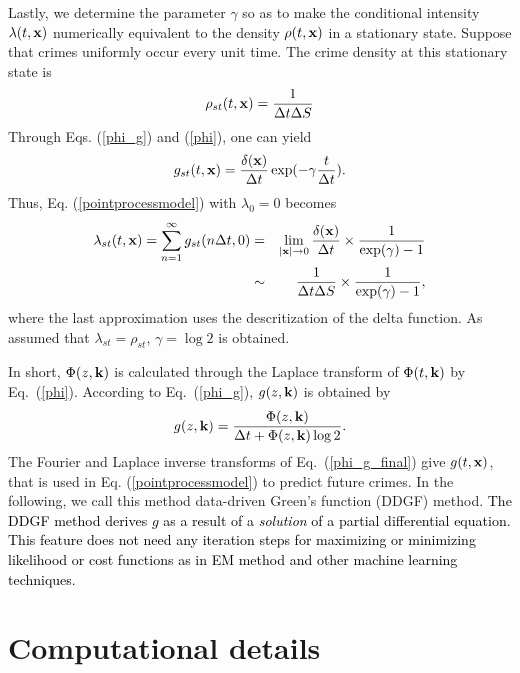 \documentclass[review]{elsarticle}
\newcommand{\red}[1]{\textcolor{black}{#1}}
\newcommand{\bv}[1]{{\bf #1}}
\newcommand{\Dt}{\Delta t}
\begin{document}
Lastly, we  determine the parameter $\gamma$ so as to
 make the conditional intensity $\lambda(t,\bv{x})$
numerically equivalent to the density $ \rho(t,\bv{x})$ in a stationary state.
Suppose that crimes uniformly
occur
every unit time. The crime density at this stationary state is
\begin{eqnarray}
 \rho_{st}(t,\bv{x}) = \frac{1}{\Delta t \Delta S} 
 \nonumber
\end{eqnarray}
Through Eqs. (\ref{phi_g}) and (\ref{phi}),
one can yield
\begin{eqnarray}
 g_{st}(t,\bv{x}) = \frac{\delta(\bv{x})}{\Delta t} 
 \exp(-\gamma \frac{t}{\Delta t}).
 \nonumber
\end{eqnarray}
 Thus, Eq. (\ref{pointprocessmodel}) with $\lambda_0 = 0$ becomes
\begin{eqnarray}
\lambda_{st}(t,\bv{x})
= \sum_{n=1}^{\infty} g_{st}(n \Dt, 0)
&=& 
\lim_{|\bv{x}|\to 0}
\frac{\delta(\bv{x})}{\Delta t} \times \frac{1}{\exp(\gamma) -1}
\nonumber \\
&\sim& \frac{1}{\Delta t \Delta S} \times \frac{1}{\exp(\gamma) -1},
\nonumber
\end{eqnarray}
where the last approximation uses the descritization of the delta function.
As assumed that $\lambda_{st} = \rho_{st}$, 
$\gamma = \log 2$ is obtained.

In short,
$\Phi(z,\bv{k})$ is calculated through the Laplace transform of
$\Phi(t,\bv{k})$ by Eq.~(\ref{phi}).
According to Eq.~(\ref{phi_g}),
$g(z,\bv{k})$ is obtained by
\begin{equation}
g(z,\bv{k})
= \frac{\Phi(z,\bv{k})}{\Delta t + \Phi(z,\bv{k}) \log 2 }.
\label{phi_g_final}
\end{equation}
The Fourier and Laplace inverse transforms of Eq.~(\ref{phi_g_final}) give
$g(t,\bv{x})$, that
is used in Eq. (\ref{pointprocessmodel}) to predict future crimes.
In the following, we call this method 
data-driven Green's function (DDGF) method.
\red{
The DDGF method derives $g$ as a result of a {\it solution} of a partial differential equation.
This feature does not need any iteration steps for maximizing or minimizing likelihood or cost functions
as in EM method and other machine learning techniques. 
}


\section{Computational details}\label{sec:3}
\end{document}
